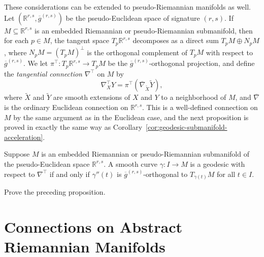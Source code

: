 These considerations can be extended to pseudo-Riemannian manifolds as well. Let $(\mathbb{R}^{r,s}, \overline{g}^{(r,s)})$ be the pseudo-Euclidean space of signature $(r,s)$. If $M \subseteq \mathbb{R}^{r,s}$ is an embedded Riemannian or pseudo-Riemannian submanifold, then for each $p \in M$, the tangent space $T_p\mathbb{R}^{r,s}$ decomposes as a direct sum $T_p M \oplus N_p M$, where $N_p M = (T_p M)^{\perp}$ is the orthogonal complement of $T_p M$ with respect to $\overline{g}^{(r,s)}$. We let $\pi^{\top}: T_p\mathbb{R}^{r,s} \to T_p M$ be the $\overline{g}^{(r,s)}$-orthogonal projection, and define the \emph{tangential connection} $\nabla^{\top}$ on $M$ by
\[
\nabla_X^{\top}Y = \pi^{\top}(\overline{\nabla}_{\tilde{X}}\tilde{Y}),
\]
where $\tilde{X}$ and $\tilde{Y}$ are smooth extensions of $X$ and $Y$ to a neighborhood of $M$, and $\overline{\nabla}$ is the ordinary Euclidean connection on $\mathbb{R}^{r,s}$. This is a well-defined connection on $M$ by the same argument as in the Euclidean case, and the next proposition is proved in exactly the same way as Corollary~\ref{cor:geodesic-submanifold-acceleration}.

\begin{proposition}
\label{prop:geodesic-pseudo-euclidean-submanifold}

Suppose $M$ is an embedded Riemannian or pseudo-Riemannian submanifold of the pseudo-Euclidean space $\mathbb{R}^{r,s}$. A smooth curve $\gamma: I \to M$ is a geodesic with respect to $\nabla^{\top}$ if and only if $\gamma''(t)$ is $\overline{g}^{(r,s)}$-orthogonal to $T_{\gamma(t)}M$ for all $t \in I$.
\end{proposition}

\begin{exercise}
\label{exer:prove-geodesic-pseudo-euclidean-submanifold}

Prove the preceding proposition.
\end{exercise}

\section{Connections on Abstract Riemannian Manifolds}


